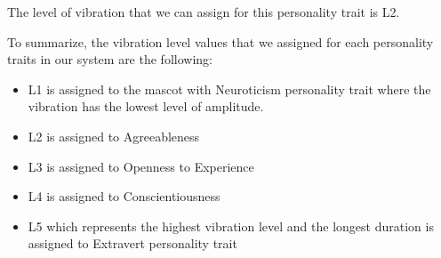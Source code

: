 \documentclass[12pt]{article}
\begin{document}
The level of vibration that we can assign for this personality trait is L2.

\par To summarize, the vibration level values that we assigned for each personality traits in our system are the following:
\begin{itemize}
\item L1 is assigned to the mascot with Neuroticism personality trait where the vibration has the lowest level of amplitude.
\item L2 is assigned to Agreeableness
\item L3 is assigned to Openness to Experience
\item L4 is assigned to Conscientiousness
\item L5 which represents the highest vibration level and the longest duration is assigned to Extravert personality trait
\end{itemize}


\renewcommand\refname{Bibliography}

\end{document}
